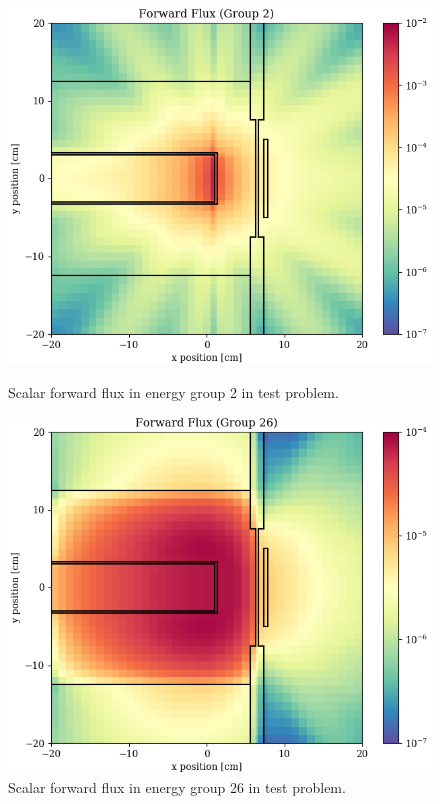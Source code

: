 \begin{figure}
  \begin{minipage}{0.49\linewidth}
    \centering
    \includegraphics[width=\linewidth]{content/testprob/scalar_flux_fwd_g02.png}
    \caption{Scalar forward flux in energy group 2 in test problem.}
    \label{fig:testprob:scalar_flux_fwd_g02}
  \end{minipage}
  \hfill
  \begin{minipage}{0.49\linewidth}
    \centering
    \includegraphics[width=\linewidth]{content/testprob/scalar_flux_fwd_g26.png}
    \caption{Scalar forward flux in energy group 26 in test problem.}
    \label{fig:testprob:scalar_flux_fwd_g26}
  \end{minipage}
\end{figure}

